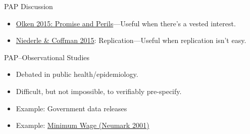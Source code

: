 \documentclass{beamer}
\begin{document}
\begin{frame}{PAP Discussion}
\begin{itemize}
\item \href{https://www.aeaweb.org/articles?id=10.1257/jep.29.3.61}{Olken 2015: Promise and Perils}---Useful when there's a vested interest.
\item \href{https://www.aeaweb.org/articles?id=10.1257/jep.29.3.81}{Niederle \& Coffman 2015}: Replication---Useful when replication isn't easy.
\end{itemize}
\end{frame}
\begin{frame}{PAP--Observational Studies}
\begin{itemize}[<.->]
\item Debated in public health/epidemiology.
\item Difficult, but not impossible, to verifiably pre-specify.
\item Example: Government data releases
\item Example: \href{http://onlinelibrary.wiley.com/enhanced/doi/10.1111/0019-8676.00199/}{Minimum Wage (Neumark 2001)}
\end{itemize}
\end{frame}

{ %
    \begin{frame}[plain]
     \end{frame}
}
\end{document}
